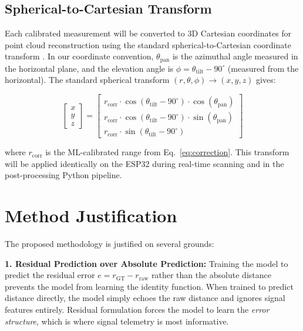 \documentclass[12pt,a4paper]{article}
\begin{document}
    \subsection{Spherical-to-Cartesian Transform}

    Each calibrated measurement will be converted to 3D Cartesian coordinates for point cloud reconstruction using the standard spherical-to-Cartesian coordinate transform \cite{hansard2012time, jimenez20143d}. In our coordinate convention, $\theta_{\text{pan}}$ is the azimuthal angle measured in the horizontal plane, and the elevation angle is $\phi = \theta_{\text{tilt}} - 90^\circ$ (measured from the horizontal). The standard spherical transform $(r, \theta, \phi) \rightarrow (x, y, z)$ gives:

    \begin{equation}
        \begin{bmatrix} x \\ y \\ z \end{bmatrix} =
        \begin{bmatrix}
            r_{\text{corr}} \cdot \cos(\theta_{\text{tilt}} - 90^\circ) \cdot \cos(\theta_{\text{pan}}) \\
            r_{\text{corr}} \cdot \cos(\theta_{\text{tilt}} - 90^\circ) \cdot \sin(\theta_{\text{pan}}) \\
            r_{\text{corr}} \cdot \sin(\theta_{\text{tilt}} - 90^\circ)
        \end{bmatrix}
        \label{eq:spherical}
    \end{equation}

    where $r_{\text{corr}}$ is the ML-calibrated range from Eq.~\ref{eq:correction}. This transform will be applied identically on the ESP32 during real-time scanning and in the post-processing Python pipeline.



    \section{Method Justification}

    The proposed methodology is justified on several grounds:

    \textbf{1. Residual Prediction over Absolute Prediction:} Training the model to predict the residual error $e = r_{\text{GT}} - r_{\text{raw}}$ rather than the absolute distance prevents the model from learning the identity function. When trained to predict distance directly, the model simply echoes the raw distance and ignores signal features entirely. Residual formulation forces the model to learn the \textit{error structure}, which is where signal telemetry is most informative.
\end{document}
